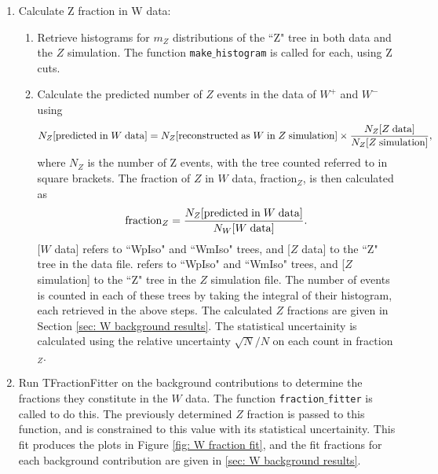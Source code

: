 \documentclass[a4paper]{article}
\begin{document}
\begin{enumerate}
    \item Calculate Z fraction in W data:
    \begin{enumerate}
        \item Retrieve histograms for $m_Z$ distributions of the ``Z" tree in both data and the $Z$ simulation. The function \texttt{make$\_$histogram} is called for each, using Z cuts.
        \item Calculate the predicted number of $Z$ events in the data of $W^+$ and $W^-$ using
        \begin{equation}
            N_Z[{\rm predicted \; in \;} W {\rm\; data}] = N_Z[{\rm reconstructed \; as \;} W {\rm \; in \;} Z {\rm \; simulation}] \times \frac{N_Z[Z {\rm \; data}]}{N_Z[Z {\rm\; simulation}]},
        \end{equation}
        where $N_Z$ is the number of Z events, with the tree counted referred to in square brackets. The fraction of $Z$ in $W$ data, fraction$_Z$, is then calculated as
        \begin{equation}
            {\rm fraction}_Z = \frac{N_Z[{\rm predicted \; in \;} W {\rm\; data}]}{N_W[W {\rm \; data}]}.
        \end{equation}
        [$W$ data] refers to ``WpIso" and ``WmIso" trees, and [$Z$ data] to the ``Z" tree in the data file.  refers to ``WpIso" and ``WmIso" trees, and [$Z$ simulation] to the ``Z" tree in the $Z$ simulation file. \newline 
        The number of events is counted in each of these trees by taking the integral of their histogram, each retrieved in the above steps. \newline
        The calculated $Z$ fractions are given in Section \ref{sec: W background results}.
        The statistical uncertainity is calculated using the relative uncertainty $\sqrt{N}/N$ on each count in fraction$_Z$.
    \end{enumerate}
    
    \item Run TFractionFitter on the background contributions to determine the fractions they constitute in the $W$ data. The function \texttt{fraction$\_$fitter} is called to do this. The previously determined $Z$ fraction is passed to this function, and is constrained to this value with its statistical uncertainity. \newline
    This fit produces the plots in Figure \ref{fig: W fraction fit}, and the fit fractions for each background contribution are given in \ref{sec: W background results}.
    

\end{enumerate}
\end{document}

